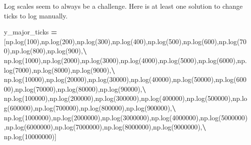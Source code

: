 \documentclass[]{book}
\newenvironment{Shaded}{\begin{snugshade}}{\end{snugshade}}
\newcommand{\DecValTok}[1]{\textcolor[rgb]{0.00,0.00,0.81}{#1}}
\newcommand{\NormalTok}[1]{#1}
\newcommand{\OperatorTok}[1]{\textcolor[rgb]{0.81,0.36,0.00}{\textbf{#1}}}
\begin{document}
Log scales seem to always be a challenge. Here is at least one solution to change ticks to log manually.

\begin{Shaded}
\begin{Highlighting}[]
\NormalTok{y_major_ticks }\OperatorTok{=}\NormalTok{ [np.log(}\DecValTok{100}\NormalTok{),np.log(}\DecValTok{200}\NormalTok{),np.log(}\DecValTok{300}\NormalTok{),np.log(}\DecValTok{400}\NormalTok{),np.log(}\DecValTok{500}\NormalTok{),np.log(}\DecValTok{600}\NormalTok{),np.log(}\DecValTok{700}\NormalTok{),np.log(}\DecValTok{800}\NormalTok{),np.log(}\DecValTok{900}\NormalTok{),}\OperatorTok{\textbackslash{}}
\NormalTok{                 np.log(}\DecValTok{1000}\NormalTok{),np.log(}\DecValTok{2000}\NormalTok{),np.log(}\DecValTok{3000}\NormalTok{),np.log(}\DecValTok{4000}\NormalTok{),np.log(}\DecValTok{5000}\NormalTok{),np.log(}\DecValTok{6000}\NormalTok{),np.log(}\DecValTok{7000}\NormalTok{),np.log(}\DecValTok{8000}\NormalTok{),np.log(}\DecValTok{9000}\NormalTok{),}\OperatorTok{\textbackslash{}}
\NormalTok{                 np.log(}\DecValTok{10000}\NormalTok{),np.log(}\DecValTok{20000}\NormalTok{),np.log(}\DecValTok{30000}\NormalTok{),np.log(}\DecValTok{40000}\NormalTok{),np.log(}\DecValTok{50000}\NormalTok{),np.log(}\DecValTok{60000}\NormalTok{),np.log(}\DecValTok{70000}\NormalTok{),np.log(}\DecValTok{80000}\NormalTok{),np.log(}\DecValTok{90000}\NormalTok{),}\OperatorTok{\textbackslash{}}
\NormalTok{                 np.log(}\DecValTok{100000}\NormalTok{),np.log(}\DecValTok{200000}\NormalTok{),np.log(}\DecValTok{300000}\NormalTok{),np.log(}\DecValTok{400000}\NormalTok{),np.log(}\DecValTok{500000}\NormalTok{),np.log(}\DecValTok{600000}\NormalTok{),np.log(}\DecValTok{700000}\NormalTok{),np.log(}\DecValTok{800000}\NormalTok{),np.log(}\DecValTok{900000}\NormalTok{),}\OperatorTok{\textbackslash{}}
\NormalTok{                 np.log(}\DecValTok{1000000}\NormalTok{),np.log(}\DecValTok{2000000}\NormalTok{),np.log(}\DecValTok{3000000}\NormalTok{),np.log(}\DecValTok{4000000}\NormalTok{),np.log(}\DecValTok{5000000}\NormalTok{),np.log(}\DecValTok{6000000}\NormalTok{),np.log(}\DecValTok{7000000}\NormalTok{),np.log(}\DecValTok{8000000}\NormalTok{),np.log(}\DecValTok{9000000}\NormalTok{),}\OperatorTok{\textbackslash{}}
\NormalTok{                 np.log(}\DecValTok{10000000}\NormalTok{)]}


\end{Highlighting}
\end{Shaded}
\end{document}
